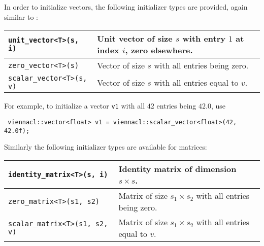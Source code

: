 In order to initialize vectors, the following initializer types are provided, again similar to {\ublas}:
\begin{center}
\begin{tabular}{|l|p{10cm}|}
 \hline
 \lstinline|unit_vector<T>(s, i)| & Unit vector of size $s$ with entry $1$ at index $i$, zero elsewhere. \\
 \hline
 \lstinline|zero_vector<T>(s)| & Vector of size $s$ with all entries being zero. \\
 \hline
 \lstinline|scalar_vector<T>(s, v)| & Vector of size $s$ with all entries equal to $v$. \\
 \hline
\end{tabular}
\end{center}
For example, to initialize a vector \lstinline|v1| with all $42$ entries being $42.0$, use
\begin{lstlisting}
 viennacl::vector<float> v1 = viennacl::scalar_vector<float>(42, 42.0f);
\end{lstlisting}

Similarly the following initializer types are available for matrices:
\begin{center}
\begin{tabular}{|l|p{10cm}|}
 \hline
 \lstinline|identity_matrix<T>(s, i)| & Identity matrix of dimension $s \times s$. \\
 \hline
 \lstinline|zero_matrix<T>(s1, s2)| & Matrix of size $s_1 \times s_2$ with all entries being zero. \\
 \hline
 \lstinline|scalar_matrix<T>(s1, s2, v)| & Matrix of size $s_1 \times s_2$ with all entries equal to $v$. \\
 \hline
\end{tabular}
\end{center}

